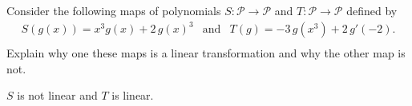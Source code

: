 
\begin{exerciseStatement}


Consider the following maps of polynomials \(S:\mathcal{P}\rightarrow\mathcal{P}\) and \(T:\mathcal{P}\rightarrow\mathcal{P}\) defined by 
\begin{align*} S(g(x))= x^{3} g\left(x\right) + 2 \, g\left(x\right)^{3}  & \text{and} & T(g)= -3 \, g\left(x^{3}\right) + 2 \, g'\left(-2\right) . \\ \end{align*}
             Explain why one these maps is a linear transformation and why the other map is not. 


\end{exerciseStatement}
    
\begin{exerciseAnswer} 


\(S\) is not linear and \(T\) is linear.


\end{exerciseAnswer}
    

